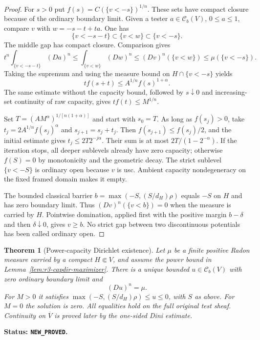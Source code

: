 \documentclass[11pt,a4paper]{article}
\numberwithin{equation}{section}
\newtheorem{theorem}{Theorem}[section]
\theoremstyle{definition}
\theoremstyle{remark}
\newcommand{\Cb}{\mathcal C_b}
\begin{document}
\begin{proof}
For $s>0$ put $f(s)=C(\{v<-s\})^{1/n}$. These sets have compact
closure because of the ordinary boundary limit. Given a tester
$a\in\Cb(V)$, $0\leq a\leq1$, compare $v$ with
$w=-s-t+ta$. One has
\[
 \{v<-s-t\}\subset\{v<w\}\subset\{v<-s\}.
\]
The middle gap has compact closure. Comparison gives
\[
 t^n\int_{\{v<-s-t\}}(Da)^n
 \leq\int_{\{v<w\}}(Dw)^n
 \leq(Dv)^n(\{v<w\})\leq\mu(\{v<-s\}).
\]
Taking the supremum and using the measure bound on
$H\cap\{v<-s\}$ yields
\[
 t f(s+t)\leq A^{1/n} f(s)^{1+\alpha}.
\]
The same estimate without the capacity bound, followed by
$s\downarrow0$ and increasing-set continuity of raw capacity,
gives $t f(t)\leq M^{1/n}$.

Set $T=(AM^\alpha)^{1/[n(1+\alpha)]}$ and start with $s_0=T$.
As long as $f(s_j)>0$, take
$t_j=2A^{1/n}f(s_j)^\alpha$ and $s_{j+1}=s_j+t_j$.
Then $f(s_{j+1})\leq f(s_j)/2$, and the initial estimate gives
$t_j\leq2T2^{-j\alpha}$. Their sum is at most
$2T/(1-2^{-\alpha})$. If the iteration stops, all deeper
sublevels already have zero capacity; otherwise $f(S)=0$ by
monotonicity and the geometric decay. The strict sublevel
$\{v<-S\}$ is ordinary open because $v$ is usc. Ambient
capacity nondegeneracy on the fixed framed domain makes it empty.

The bounded classical barrier
$b=\max(-S,(S/d_H)\rho)$ equals $-S$ on $H$ and has zero
boundary limit. Thus $(Dv)^n(\{v<b\})=0$ when the measure is
carried by $H$. Pointwise domination, applied first with the
positive margin $b-\delta$ and then $\delta\downarrow0$,
gives $v\geq b$. No strict gap between two discontinuous
potentials has been called ordinary open.
\end{proof}

\begin{theorem}[Power-capacity Dirichlet existence]
\label{thm:r3-capacity-dirichlet}
Let $\mu$ be a finite positive Radon measure carried by a compact
$H\Subset V$, and assume the power bound in
Lemma~\ref{lem:r3-capdir-maximizer}. There is a unique bounded
$u\in\Cb(V)$ with zero ordinary boundary limit and
\[
 (Du)^n=\mu.
\]
For $M>0$ it satisfies
$\max(-S,(S/d_H)\rho)\leq u\leq0$, with $S$ as above.
For $M=0$ the solution is zero. All equalities hold on the full
original test sheaf. Continuity on $\overline V$ is proved later
by the one-sided Dini estimate.
\end{theorem}

\noindent\textbf{Status: \texttt{NEW\_PROVED}.}
\end{document}
